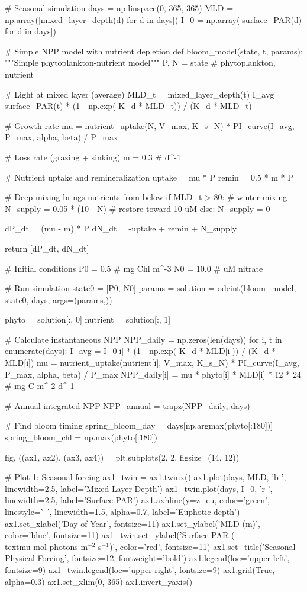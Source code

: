 \documentclass[a4paper, 11pt]{article}
\begin{document}
\begin{pycode}
# Seasonal simulation
days = np.linspace(0, 365, 365)
MLD = np.array([mixed_layer_depth(d) for d in days])
I_0 = np.array([surface_PAR(d) for d in days])

# Simple NPP model with nutrient depletion
def bloom_model(state, t, params):
    """Simple phytoplankton-nutrient model"""
    P, N = state  # phytoplankton, nutrient

    # Light at mixed layer (average)
    MLD_t = mixed_layer_depth(t)
    I_avg = surface_PAR(t) * (1 - np.exp(-K_d * MLD_t)) / (K_d * MLD_t)

    # Growth rate
    mu = nutrient_uptake(N, V_max, K_s_N) * PI_curve(I_avg, P_max, alpha, beta) / P_max

    # Loss rate (grazing + sinking)
    m = 0.3  # d^-1

    # Nutrient uptake and remineralization
    uptake = mu * P
    remin = 0.5 * m * P

    # Deep mixing brings nutrients from below
    if MLD_t > 80:  # winter mixing
        N_supply = 0.05 * (10 - N)  # restore toward 10 uM
    else:
        N_supply = 0

    dP_dt = (mu - m) * P
    dN_dt = -uptake + remin + N_supply

    return [dP_dt, dN_dt]

# Initial conditions
P0 = 0.5  # mg Chl m^-3
N0 = 10.0  # uM nitrate

# Run simulation
state0 = [P0, N0]
params = {}
solution = odeint(bloom_model, state0, days, args=(params,))

phyto = solution[:, 0]
nutrient = solution[:, 1]

# Calculate instantaneous NPP
NPP_daily = np.zeros(len(days))
for i, t in enumerate(days):
    I_avg = I_0[i] * (1 - np.exp(-K_d * MLD[i])) / (K_d * MLD[i])
    mu = nutrient_uptake(nutrient[i], V_max, K_s_N) * PI_curve(I_avg, P_max, alpha, beta) / P_max
    NPP_daily[i] = mu * phyto[i] * MLD[i] * 12 * 24  # mg C m^-2 d^-1

# Annual integrated NPP
NPP_annual = trapz(NPP_daily, days)

# Find bloom timing
spring_bloom_day = days[np.argmax(phyto[:180])]
spring_bloom_chl = np.max(phyto[:180])

fig, ((ax1, ax2), (ax3, ax4)) = plt.subplots(2, 2, figsize=(14, 12))

# Plot 1: Seasonal forcing
ax1_twin = ax1.twinx()
ax1.plot(days, MLD, 'b-', linewidth=2.5, label='Mixed Layer Depth')
ax1_twin.plot(days, I_0, 'r-', linewidth=2.5, label='Surface PAR')
ax1.axhline(y=z_eu, color='green', linestyle='--', linewidth=1.5, alpha=0.7, label='Euphotic depth')
ax1.set_xlabel('Day of Year', fontsize=11)
ax1.set_ylabel('MLD (m)', color='blue', fontsize=11)
ax1_twin.set_ylabel('Surface PAR (\\textmu mol photons m$^{-2}$ s$^{-1}$)', color='red', fontsize=11)
ax1.set_title('Seasonal Physical Forcing', fontsize=12, fontweight='bold')
ax1.legend(loc='upper left', fontsize=9)
ax1_twin.legend(loc='upper right', fontsize=9)
ax1.grid(True, alpha=0.3)
ax1.set_xlim(0, 365)
ax1.invert_yaxis()


\end{pycode}
\end{document}
